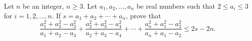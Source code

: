 Let $n$ be an integer, $n \geq 3$. Let $a_1, a_2, \ldots, a_n$ be real numbers such that $2 \leq a_i \leq 3$ for $i = 1, 2, \ldots, n$. If $s = a_1 + a_2 + \cdots + a_n$, prove that
\[ \frac{a_1^2 + a_2^2 - a_3^2}{a_1 + a_2 - a_3} + \frac{a_2^2 + a_3^2 - a_4^2}{a_2 + a_3 - a_4} + \cdots + \frac{a_n^2 + a_1^2 - a_2^2}{a_n + a_1 - a_2} \leq 2s - 2n. \]
